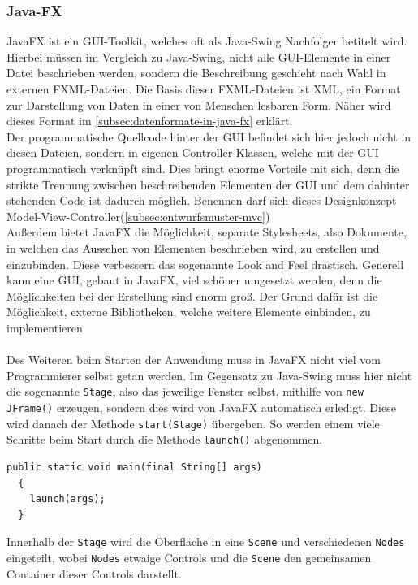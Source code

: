 \subsubsection{Java-FX}\label{sssec: JavaFX}
JavaFX ist ein GUI-Toolkit, welches oft als Java-Swing Nachfolger betitelt wird.
Hierbei müssen im Vergleich zu Java-Swing, nicht alle GUI-Elemente in einer Datei beschrieben werden, sondern die Beschreibung geschieht nach Wahl in externen FXML-Dateien.
Die Basis dieser FXML-Dateien ist \acs{XML}, ein Format zur Darstellung von Daten in einer von Menschen lesbaren Form.
Näher wird dieses Format im \autoref{subsec:datenformate-in-java-fx} erklärt.\\
Der programmatische Quellcode hinter der GUI befindet sich hier jedoch nicht in diesen Dateien, sondern in eigenen Controller-Klassen, welche mit der GUI programmatisch verknüpft sind.
Dies bringt enorme Vorteile mit sich, denn die strikte Trennung zwischen beschreibenden Elementen der GUI und dem dahinter stehenden Code ist dadurch möglich.
Benennen darf sich dieses Designkonzept Model-View-Controller(\autoref{subsec:entwurfsmuster-mvc})\\
Außerdem bietet JavaFX die Möglichkeit, separate Stylesheets, also Dokumente, in welchen das Aussehen von Elementen beschrieben wird, zu erstellen und einzubinden.
Diese verbessern das sogenannte Look and Feel drastisch.
Generell kann eine GUI, gebaut in JavaFX, viel schöner umgesetzt werden, denn die Möglichkeiten bei der Erstellung sind enorm groß.
Der Grund dafür ist die Möglichkeit, externe Bibliotheken, welche weitere Elemente einbinden, zu implementieren\\\\
Des Weiteren beim Starten der Anwendung muss in JavaFX nicht viel vom Programmierer selbst getan werden.
Im Gegensatz zu Java-Swing muss hier nicht die sogenannte \lstinline[style=java]{Stage}, also das jeweilige Fenster selbst, mithilfe von \lstinline[style=java]{new JFrame()} erzeugen, sondern dies wird von JavaFX automatisch erledigt.
Diese wird danach der Methode \lstinline[style=java]{start(Stage)} übergeben.
So werden einem viele Schritte beim Start durch die Methode \lstinline[style=java]{launch()} abgenommen.
\begin{lstlisting}[style=java,caption=JavaFX Startvorgang,label=javafxStart]
  public static void main(final String[] args)
  {
    launch(args);
  }
\end{lstlisting}
Innerhalb der \lstinline[style=java]{Stage} wird die Oberfläche in eine \lstinline[style=java]{Scene} und verschiedenen \lstinline[style=java]{Nodes} eingeteilt, wobei \lstinline[style=java]{Nodes} etwaige Controls und die \lstinline[style=java]{Scene} den gemeinsamen Container dieser Controls darstellt.
